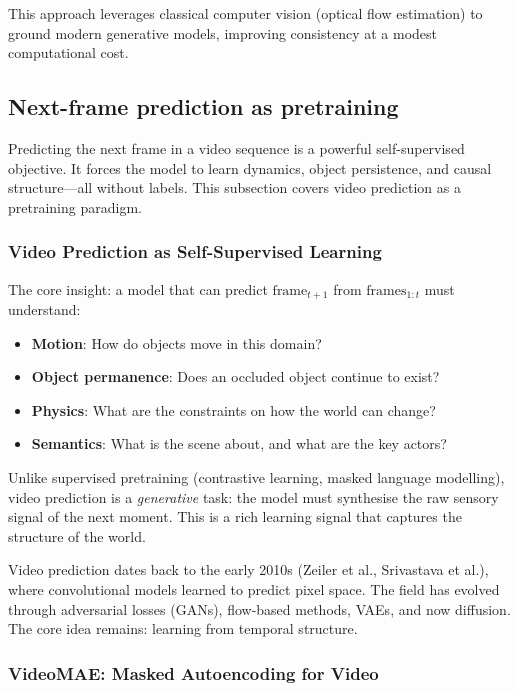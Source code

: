 This approach leverages classical computer vision (optical flow estimation) to ground modern generative models, improving consistency at a modest computational cost.

\subsection{Next-frame prediction as pretraining}

Predicting the next frame in a video sequence is a powerful self-supervised objective. It forces the model to learn dynamics, object persistence, and causal structure—all without labels. This subsection covers video prediction as a pretraining paradigm.

\subsubsection{Video Prediction as Self-Supervised Learning}

The core insight: a model that can predict $\text{frame}_{t+1}$ from $\text{frames}_{1:t}$ must understand:
\begin{itemize}
  \item \textbf{Motion}: How do objects move in this domain?
  \item \textbf{Object permanence}: Does an occluded object continue to exist?
  \item \textbf{Physics}: What are the constraints on how the world can change?
  \item \textbf{Semantics}: What is the scene about, and what are the key actors?
\end{itemize}

Unlike supervised pretraining (contrastive learning, masked language modelling), video prediction is a \emph{generative} task: the model must synthesise the raw sensory signal of the next moment. This is a rich learning signal that captures the structure of the world.

\begin{paperbox}[title={Historical Roots}]
Video prediction dates back to the early 2010s (Zeiler et al., Srivastava et al.), where convolutional models learned to predict pixel space. The field has evolved through adversarial losses (GANs), flow-based methods, VAEs, and now diffusion. The core idea remains: learning from temporal structure.
\end{paperbox}

\subsubsection{VideoMAE: Masked Autoencoding for Video}

